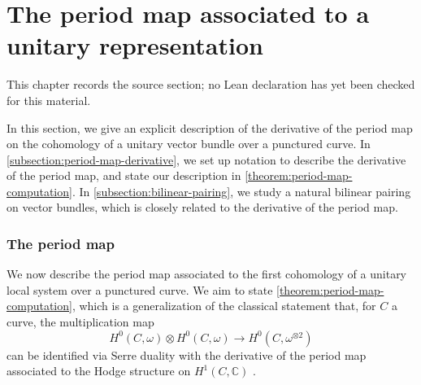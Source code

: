 \chapter{The period map associated to a unitary representation}
\label{canonical-representations-surface-groups-chapter-05}

\begin{remark}
\label{canonical-representations-surface-groups-chapter-05-source}
This chapter records the source section; no Lean declaration has yet been checked for this material.
\notready
\end{remark}

\label{section:unitary-period-map}

In this section, we give an explicit description of the derivative of the period map
on the cohomology of a unitary vector bundle over a punctured curve.
In \autoref{subsection:period-map-derivative},
we set up notation to describe the derivative of the period map,
and state our description in
\autoref{theorem:period-map-computation}.
In \autoref{subsection:bilinear-pairing},
we study a natural bilinear pairing on vector bundles,
which is closely related to the derivative of the period map.

\subsection{The period map}
	\label{subsection:period-map-derivative}
	We now describe the period map associated to the
first cohomology of a unitary local system over a punctured curve.
We aim to state \autoref{theorem:period-map-computation}, which is a
generalization of the classical statement that, for $C$ a curve, the multiplication map
$$H^0(C, \omega) \otimes H^0(C, \omega) \to H^0(C, \omega^{\otimes 2})$$ can be
identified via Serre duality with the derivative of the period map associated to the Hodge structure on
$H^1(C, \mathbb C)$ \cite[Lemma 10.22]{Voisin:hodgeTheory}.

